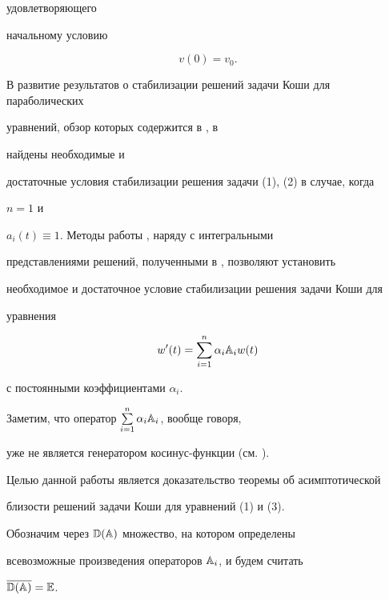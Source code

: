 удовлетворяющего 


начальному условию 


\begin{equation} 


v(0)=v_0. 


\end{equation} 


 


В развитие результатов о стабилизации решений задачи Коши для параболических 


уравнений, обзор которых содержится в \cite{Den}, в \cite{G1} 


найдены необходимые и 


достаточные условия стабилизации решения задачи (1), (2) в случае, когда 


$n=1$ и 


$a_i(t)\equiv 1$. Методы работы \cite{G1}, наряду с интегральными 


представлениями решений, полученными в \cite{G2}, позволяют установить 


необходимое и достаточное условие стабилизации решения задачи Коши для 


уравнения 


\begin{equation} 


w'(t)=\sum^n_{i=1}\alpha_i\Bbb A_iw(t) 


\end{equation} 


с постоянными коэффициентами $\alpha_i$. 


Заметим, что оператор $\sum\limits^n_{i=1}\alpha_i\Bbb A_i$, вообще говоря, 


уже не является генератором косинус-функции (см. \cite{Vas}). 


 


Целью данной работы является доказательство теоремы об асимптотической 


близости решений задачи Коши для уравнений (1) и (3). 


 


Обозначим через $\Bbb D(\Bbb A)$ множество, на котором определены 


всевозможные произведения операторов $\Bbb A_i$, и будем считать 


$\overline{\Bbb D(\Bbb A)}=\Bbb E$. 


